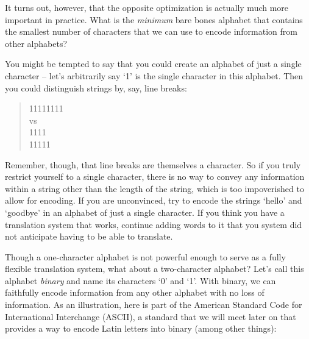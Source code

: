 \documentclass[UTF8]{book}
\begin{document}
\begin{CJK}{UTF8}{gbsn}
It turns out, however, that the opposite optimization is actually much more important in practice. What is the \emph{minimum} bare bones alphabet that contains the smallest number of characters that we can use to encode information from other alphabets?

You might be tempted to say that you could create an alphabet of just a single character -- let's arbitrarily say `1' is the single character in this alphabet. Then you could distinguish strings by, say, line breaks:

\begin{quotation}
\centering

11111111 \\

vs \\

1111 \\
11111

\end{quotation}

Remember, though, that line breaks are themselves a character. So if you truly restrict yourself to a single character, there is no way to convey any information within a string other than the length of the string, which is too impoverished to allow for encoding. If you are unconvinced, try to encode the strings `hello' and `goodbye' in an alphabet of just a single character. If you think you have a translation system that works, continue adding words to it that you system did not anticipate having to be able to translate.

Though a one-character alphabet is not powerful enough to serve as a fully flexible translation system, what about a two-character alphabet? Let's call this alphabet \emph{binary} and name its characters `0' and `1'. With binary, we can faithfully encode information from any other alphabet with no loss of information. As an illustration, here is part of the American Standard Code for International Interchange (ASCII), a standard that we will meet later on that provides a way to encode Latin letters into binary (among other things):


\end{CJK}
\end{document}
